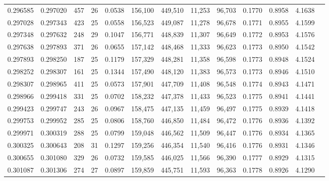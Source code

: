 \begin{tabular}{rrrrrrrrrrrrr}
0.296585 & 0.297020 &   457 &  26 &                                     0.0538 & 156,100 & 449,510 &  11,253 &  96,703 & 0.1770 & 0.8958 & 4.1638 \\
0.297028 & 0.297343 &   423 &  25 &                                     0.0558 & 156,523 & 449,087 &  11,278 &  96,678 & 0.1771 & 0.8955 & 4.1599 \\
0.297348 & 0.297632 &   248 &  29 &                                     0.1047 & 156,771 & 448,839 &  11,307 &  96,649 & 0.1772 & 0.8953 & 4.1576 \\
0.297638 & 0.297893 &   371 &  26 &                                     0.0655 & 157,142 & 448,468 &  11,333 &  96,623 & 0.1773 & 0.8950 & 4.1542 \\
0.297893 & 0.298250 &   187 &  25 &                                     0.1179 & 157,329 & 448,281 &  11,358 &  96,598 & 0.1773 & 0.8948 & 4.1524 \\
0.298252 & 0.298307 &   161 &  25 &                                     0.1344 & 157,490 & 448,120 &  11,383 &  96,573 & 0.1773 & 0.8946 & 4.1510 \\
0.298307 & 0.298965 &   411 &  25 &                                     0.0573 & 157,901 & 447,709 &  11,408 &  96,548 & 0.1774 & 0.8943 & 4.1471 \\
0.298966 & 0.299418 &   331 &  25 &                                     0.0702 & 158,232 & 447,378 &  11,433 &  96,523 & 0.1775 & 0.8941 & 4.1441 \\
0.299423 & 0.299747 &   243 &  26 &                                     0.0967 & 158,475 & 447,135 &  11,459 &  96,497 & 0.1775 & 0.8939 & 4.1418 \\
0.299753 & 0.299952 &   285 &  25 &                                     0.0806 & 158,760 & 446,850 &  11,484 &  96,472 & 0.1776 & 0.8936 & 4.1392 \\
0.299971 & 0.300319 &   288 &  25 &                                     0.0799 & 159,048 & 446,562 &  11,509 &  96,447 & 0.1776 & 0.8934 & 4.1365 \\
0.300325 & 0.300643 &   208 &  31 &                                     0.1297 & 159,256 & 446,354 &  11,540 &  96,416 & 0.1776 & 0.8931 & 4.1346 \\
0.300655 & 0.301080 &   329 &  26 &                                     0.0732 & 159,585 & 446,025 &  11,566 &  96,390 & 0.1777 & 0.8929 & 4.1315 \\
0.301087 & 0.301306 &   274 &  27 &                                     0.0897 & 159,859 & 445,751 &  11,593 &  96,363 & 0.1778 & 0.8926 & 4.1290 \\

\end{tabular}
